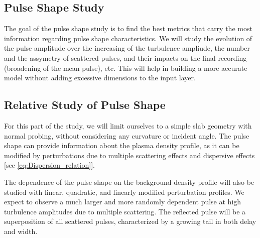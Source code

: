 \documentclass[11pt,a4paper,openany]{report}
\begin{document}
\begin{multicols}{2}
    \section{Pulse Shape Study}

    The goal of the pulse shape study is to find the best metrics that carry the most information regarding pulse shape characteristics. We will study the evolution of the pulse amplitude over the increasing of the turbulence ampliude, the number and the assymetry of scattered pulses, and their impacts on the final recording (broadening of the mean pulse), etc. This will help in building a more accurate model without adding excessive dimensions to the input layer.

    \subsection{Relative Study of Pulse Shape}

    For this part of the study, we will limit ourselves to a simple slab geometry with normal probing, without considering any curvature or incident angle. The pulse shape can provide information about the plasma density profile, as it can be modified by perturbations due to multiple scattering effects and dispersive effects [see \ref{eq:Dispersion_relation}].

    The dependence of the pulse shape on the background density profile will also be studied with linear, quadratic, and linearly modified perturbation profiles. We expect to observe a much larger and more randomly dependent pulse at high turbulence amplitudes due to multiple scattering. The reflected pulse will be a superposition of all scattered pulses, characterized by a growing tail in both delay and width.


\end{multicols}
\end{document}
